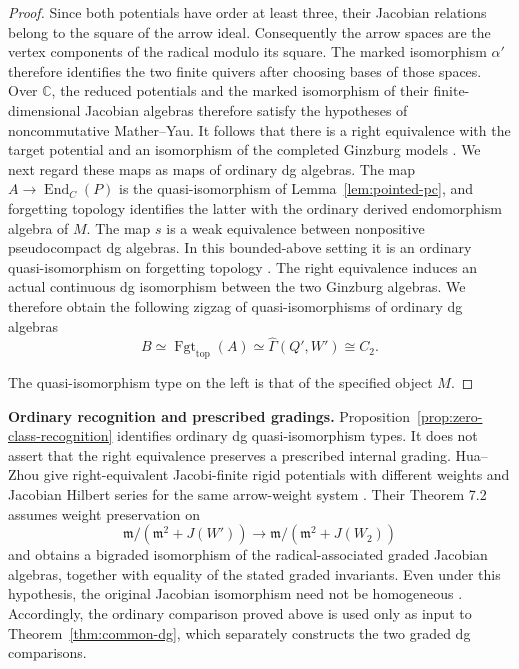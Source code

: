 \documentclass[12pt,a4paper,english,reqno]{amsart}
\theoremstyle{plain}
\theoremstyle{definition}
\numberwithin{equation}{section}
\newcommand{\thmref}[1]{Theorem~\ref{#1}}
\newcommand{\prpref}[1]{Proposition~\ref{#1}}
\newcommand{\lemref}[1]{Lemma~\ref{#1}}
\def\al{\alpha}
\def\Ga{\Gamma}
\def\End{\operatorname{End}}
\def\bbC{{\mathbb C}}
\def\iso{\cong}
\newcommand{\Fgt}{\operatorname{Fgt}}
\begin{document}
\begin{proof}
Since both potentials have order at least three, their Jacobian relations belong to the square of the arrow ideal. Consequently the arrow spaces are the vertex components of the radical modulo its square. The marked isomorphism $\al'$ therefore identifies the two finite quivers after choosing bases of those spaces. Over $\bbC$, the reduced potentials and the marked isomorphism of their finite-dimensional Jacobian algebras therefore satisfy the hypotheses of noncommutative Mather--Yau. It follows that there is a right equivalence with the target potential and an isomorphism of the completed Ginzburg models \cite[Theorems 3.5 and 4.3]{HZ}. We next regard these maps as maps of ordinary dg algebras. The map $A\to\End_C(P)$ is the quasi-isomorphism of \lemref{lem:pointed-pc}, and forgetting topology identifies the latter with the ordinary derived endomorphism algebra of $M$. The map $s$ is a weak equivalence between nonpositive pseudocompact dg algebras. In this bounded-above setting it is an ordinary quasi-isomorphism on forgetting topology \cite[Section 6 and Appendix A]{VdB}. The right equivalence induces an actual continuous dg isomorphism between the two Ginzburg algebras. We therefore obtain the following zigzag of quasi-isomorphisms of ordinary dg algebras
\[
 B\simeq\Fgt_{\mathrm{top}}(A)
 \simeq\widehat\Ga(Q',W')
 \iso C_2.
\]

The quasi-isomorphism type on the left is that of the specified object $M$.
\end{proof}

\medskip\noindent\textbf{Ordinary recognition and prescribed gradings.}
\prpref{prop:zero-class-recognition} identifies ordinary dg quasi-isomorphism types. It does not assert that the right equivalence preserves a prescribed internal grading. Hua--Zhou give right-equivalent Jacobi-finite rigid potentials with different weights and Jacobian Hilbert series for the same arrow-weight system \cite[Example 7.6]{HZFinite}. Their Theorem 7.2 assumes weight preservation on
\[
 \mathfrak m/(\mathfrak m^2+J(W'))
 \longrightarrow\mathfrak m/(\mathfrak m^2+J(W_2))
\]
and obtains a bigraded isomorphism of the radical-associated graded Jacobian algebras, together with equality of the stated graded invariants. Even under this hypothesis, the original Jacobian isomorphism need not be homogeneous \cite[Example 7.3]{HZFinite}. Accordingly, the ordinary comparison proved above is used only as input to \thmref{thm:common-dg}, which separately constructs the two graded dg comparisons.
\end{document}
